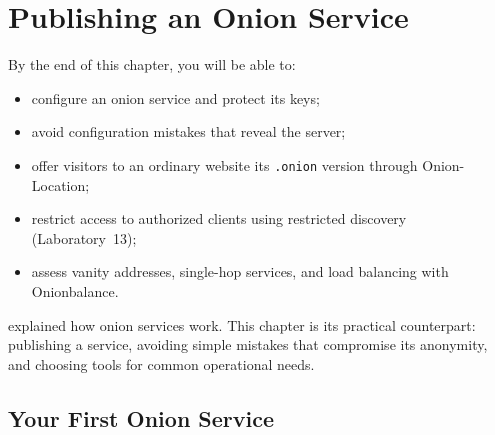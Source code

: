 \chapter{Publishing an Onion Service}\label{cap:21-onion-pratica}

\begin{obiettivi}
By the end of this chapter, you will be able to:
\begin{itemize}[nosep]
  \item configure an onion service and protect its keys;
  \item avoid configuration mistakes that reveal the server;
  \item offer visitors to an ordinary website its \texttt{.onion} version through Onion-Location;
  \item restrict access to authorized clients using restricted discovery (Laboratory~13);
  \item assess vanity addresses, single-hop services, and load balancing with Onionbalance.
\end{itemize}
\end{obiettivi}

 explained how onion services work. This chapter is its practical counterpart: publishing a service, avoiding simple mistakes that compromise its anonymity, and choosing tools for common operational needs.

\section{Your First Onion Service}\label{sec:onionp-primo}

